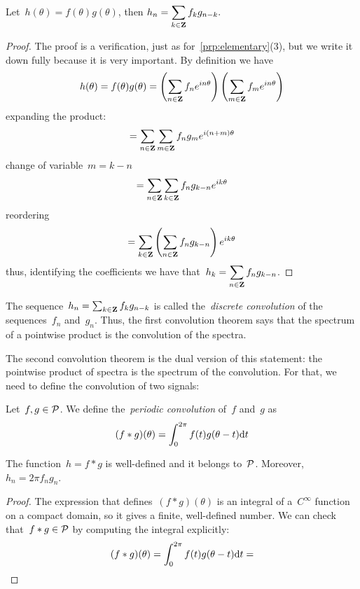 \begin{proposition}
	Let~$h(\theta)=f(\theta)g(\theta)$, then
	\(
		\displaystyle h_n
		= \sum_{k\in\mathbf{Z}} f_kg_{n-k}.
		\)
\end{proposition}

\begin{proof}
	The proof is a verification, just as for~\ref{prp:elementary}(3), but
	we write it down fully because it is very important.  By definition we
	have
	\[
		h(\theta)=f(\theta)g(\theta)
		=
		\left(\sum_{n\in\mathbf{Z}}f_ne^{in\theta}\right)
		\left(\sum_{m\in\mathbf{Z}}f_me^{in\theta}\right)
	\]
	expanding the product:
	\[
		=
		\sum_{n\in\mathbf{Z}}\sum_{m\in\mathbf{Z}} f_n g_m e^{i(n+m)\theta}
	\]
	change of variable~$m=k-n$
	\[
		=\sum_{n\in\mathbf{Z}}\sum_{k\in\mathbf{Z}} f_n g_{k-n} e^{ik\theta}
	\]
	reordering
	\[
		=\sum_{k\in\mathbf{Z}}\left(\sum_{n\in\mathbf{Z}} f_n g_{k-n}\right)e^{ik\theta}
	\]
	thus, identifying the coefficients we have
	that~$\displaystyle h_k=\sum_{n\in\mathbf{Z}} f_n g_{k-n}$.
\end{proof}

The sequence~$h_n=\sum_{k\in\mathbf{Z}} f_k g_{n-k}$ is called the~\emph{discrete
convolution} of the sequences~$f_n$ and~$g_n$.  Thus, the first convolution
theorem says that the spectrum of a pointwise product is the convolution of the
spectra.

The second convolution theorem is the dual version of this statement: the
pointwise product of spectra is the spectrum of the convolution.  For that, we
need to define the convolution of two signals:

\begin{definition}
	Let~$f,g\in\mathcal{P}$.  We define the~\emph{periodic convolution} of~$f$
	and~$g$ as
	\[
		(f*g)(\theta)=\int_0^{2\pi}f(t)g(\theta-t)\mathrm{d} t
	\]
\end{definition}

\begin{proposition}
	The function~$h=f*g$ is well-defined and it belongs to~$\mathcal{P}$.
	Moreover,~$h_n=2\pi f_n g_n$.
\end{proposition}

\begin{proof}
	The expression that defines~$(f*g)(\theta)$ is an integral of
	a~$C^\infty$ function on a compact domain, so it gives a finite,
	well-defined number.  We can check that~$f*g\in\mathcal{P}$ by computing the
	integral explicitly:
	\[
		(f*g)(\theta)=\int_0^{2\pi}f(t)g(\theta-t)\mathrm{d} t
		=
	\]
\end{proof}


